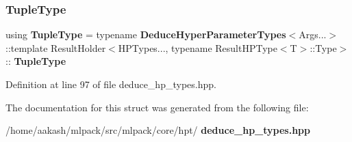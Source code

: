 \subsubsection{Tuple\+Type}
{\footnotesize\ttfamily using \textbf{ Tuple\+Type} =  typename \textbf{ Deduce\+Hyper\+Parameter\+Types}$<$Args...$>$\+::template Result\+Holder$<$H\+P\+Types..., typename Result\+H\+P\+Type$<$T$>$\+::Type$>$\+::\textbf{ Tuple\+Type}}



Definition at line 97 of file deduce\+\_\+hp\+\_\+types.\+hpp.



The documentation for this struct was generated from the following file\+:\begin{DoxyCompactItemize}
\item 
/home/aakash/mlpack/src/mlpack/core/hpt/\textbf{ deduce\+\_\+hp\+\_\+types.\+hpp}\end{DoxyCompactItemize}
